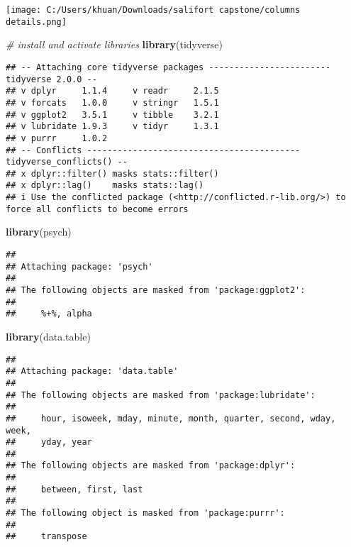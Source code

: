 \documentclass[
]{article}
\newenvironment{Shaded}{\begin{snugshade}}{\end{snugshade}}
\newcommand{\CommentTok}[1]{\textcolor[rgb]{0.56,0.35,0.01}{\textit{#1}}}
\newcommand{\FunctionTok}[1]{\textcolor[rgb]{0.13,0.29,0.53}{\textbf{#1}}}
\newcommand{\NormalTok}[1]{#1}
\begin{document}
\texttt{[image: C:/Users/khuan/Downloads/salifort capstone/columns details.png]}

\begin{Shaded}
\begin{Highlighting}[]
\CommentTok{\# install and activate libraries}
\FunctionTok{library}\NormalTok{(tidyverse)}
\end{Highlighting}
\end{Shaded}

\begin{verbatim}
## -- Attaching core tidyverse packages ------------------------ tidyverse 2.0.0 --
## v dplyr     1.1.4     v readr     2.1.5
## v forcats   1.0.0     v stringr   1.5.1
## v ggplot2   3.5.1     v tibble    3.2.1
## v lubridate 1.9.3     v tidyr     1.3.1
## v purrr     1.0.2     
## -- Conflicts ------------------------------------------ tidyverse_conflicts() --
## x dplyr::filter() masks stats::filter()
## x dplyr::lag()    masks stats::lag()
## i Use the conflicted package (<http://conflicted.r-lib.org/>) to force all conflicts to become errors
\end{verbatim}

\begin{Shaded}
\begin{Highlighting}[]
\FunctionTok{library}\NormalTok{(psych)}
\end{Highlighting}
\end{Shaded}

\begin{verbatim}
## 
## Attaching package: 'psych'
## 
## The following objects are masked from 'package:ggplot2':
## 
##     %+%, alpha
\end{verbatim}

\begin{Shaded}
\begin{Highlighting}[]
\FunctionTok{library}\NormalTok{(data.table)}
\end{Highlighting}
\end{Shaded}

\begin{verbatim}
## 
## Attaching package: 'data.table'
## 
## The following objects are masked from 'package:lubridate':
## 
##     hour, isoweek, mday, minute, month, quarter, second, wday, week,
##     yday, year
## 
## The following objects are masked from 'package:dplyr':
## 
##     between, first, last
## 
## The following object is masked from 'package:purrr':
## 
##     transpose
\end{verbatim}
\end{document}
